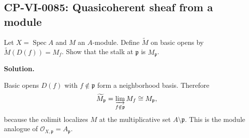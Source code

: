 
\subsection*{CP-VI-0085: Quasicoherent sheaf from a module}

Let $X=\operatorname{Spec}A$ and $M$ an $A$-module. Define $\widetilde M$ on basic opens by $\widetilde M(D(f))=M_f$. Show that the stalk at $\mathfrak p$ is $M_{\mathfrak p}$.

\medskip
\noindent\textbf{Solution.}

Basic opens $D(f)$ with $f\notin\mathfrak p$ form a neighborhood basis. Therefore
\[
\widetilde M_{\mathfrak p}
=\varinjlim_{f\notin\mathfrak p} M_f
\cong M_{\mathfrak p},
\]
because the colimit localizes $M$ at the multiplicative set $A\setminus\mathfrak p$. This is the module analogue of $\mathcal O_{X,\mathfrak p}=A_{\mathfrak p}$.
